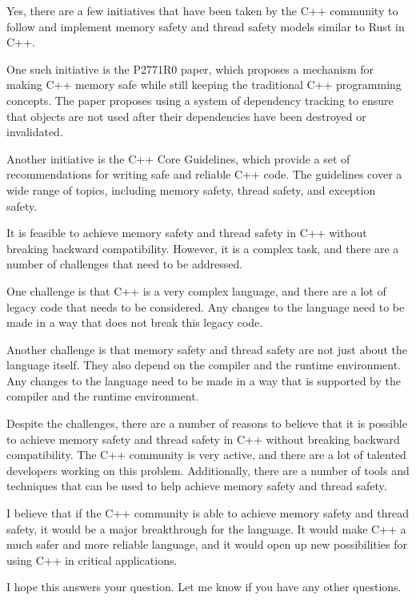 \documentclass[11pt]{article}
\begin{document}
Yes, there are a few initiatives that have been taken by the C++ community to follow and implement memory safety and thread safety models similar to Rust in C++.

One such initiative is the P2771R0 paper, which proposes a mechanism for making C++ memory safe while still keeping the traditional C++ programming concepts. The paper proposes using a system of dependency tracking to ensure that objects are not used after their dependencies have been destroyed or invalidated.

Another initiative is the C++ Core Guidelines, which provide a set of recommendations for writing safe and reliable C++ code. The guidelines cover a wide range of topics, including memory safety, thread safety, and exception safety.

It is feasible to achieve memory safety and thread safety in C++ without breaking backward compatibility. However, it is a complex task, and there are a number of challenges that need to be addressed.

One challenge is that C++ is a very complex language, and there are a lot of legacy code that needs to be considered. Any changes to the language need to be made in a way that does not break this legacy code.

Another challenge is that memory safety and thread safety are not just about the language itself. They also depend on the compiler and the runtime environment. Any changes to the language need to be made in a way that is supported by the compiler and the runtime environment.

Despite the challenges, there are a number of reasons to believe that it is possible to achieve memory safety and thread safety in C++ without breaking backward compatibility. The C++ community is very active, and there are a lot of talented developers working on this problem. Additionally, there are a number of tools and techniques that can be used to help achieve memory safety and thread safety.

I believe that if the C++ community is able to achieve memory safety and thread safety, it would be a major breakthrough for the language. It would make C++ a much safer and more reliable language, and it would open up new possibilities for using C++ in critical applications.

I hope this answers your question. Let me know if you have any other questions.
\end{document}
